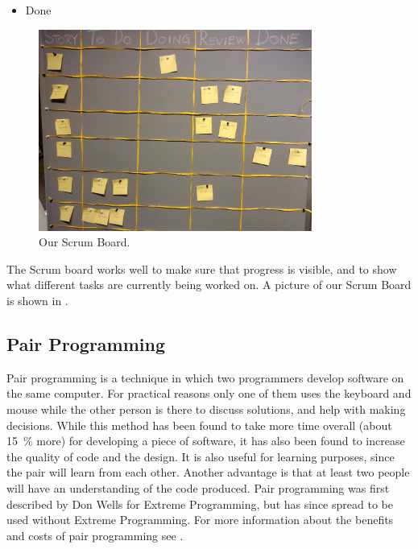 \begin{description}
\begin{itemize}
		\item Done
	\end{itemize}
	\begin{figure}
	  \begin{center}
	    \includegraphics[width=0.80\textwidth]{figures/img/scrumboard_compressed.jpg}
	  \end{center}
	  \caption{Our Scrum Board.}
	  \label{fig:scrumboard}
	\end{figure}
	The Scrum board works well to make sure that progress is visible, and to show what different tasks are currently being worked on.
	A picture of our Scrum Board is shown in .
\end{description}

\subsection*{Pair Programming}\label{subsubsec:pairprogramming}
Pair programming is a technique in which two programmers develop software on the same computer. 
For practical reasons only one of them uses the keyboard and mouse while the other person is there to discuss solutions, and help with making decisions. 
While this method has been found to take more time overall (about 15~\% more) for developing a piece of software, it has also been found to increase the quality of code and the design.
It is also useful for learning purposes, since the pair will learn from each other. 
Another advantage is that at least two people will have an understanding of the code produced. 
Pair programming was first described by Don Wells for Extreme Programming, but has since spread to be used without Extreme Programming. 
For more information about the benefits and costs of pair programming see \cite{cockburn2000costs}.


